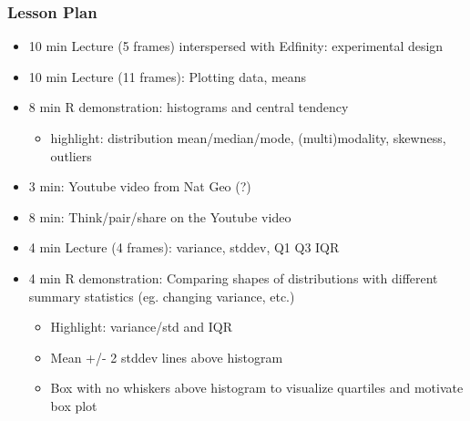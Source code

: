 \begin{frame}
    \frametitle{Lesson Plan}
    \begin{itemize}
        \item 10 min Lecture (5 frames) interspersed with Edfinity: experimental design
        \item 10 min Lecture (11 frames): Plotting data, means
        \item 8 min R demonstration: histograms and central tendency
        \begin{itemize}
            \item  highlight: distribution mean/median/mode, (multi)modality, skewness, outliers
        \end{itemize}
        \item 3 min: Youtube video from Nat Geo (?)
        \item 8 min: Think/pair/share on the Youtube video
        \item 4 min Lecture (4 frames): variance, stddev, Q1 Q3 IQR
        \item 4 min R demonstration: Comparing shapes of distributions with different summary statistics (eg. changing variance, etc.)
        \begin{itemize}
            \item Highlight: variance/std and IQR
            \item Mean +/- 2 stddev lines above histogram
            \item Box with no whiskers above histogram to visualize quartiles and motivate box plot
         \end{itemize}
     \end{itemize}
\end{frame}


